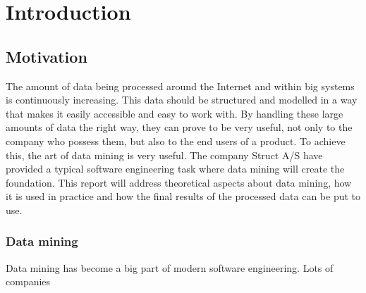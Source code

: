 
\chapter{Introduction} %

\label{ChapterX} %


\section{Motivation}
The amount of data being processed around the Internet and within big systems is continuously increasing. This data should be structured and modelled in a way that makes it easily accessible and easy to work with. By handling these large amounts of data the right way, they can prove to be very useful, not only to the company who possess them, but also to the end users of a product. To achieve this, the art of data mining is very useful.
The company Struct A/S have provided a typical software engineering task where data mining will create the foundation. This report will address theoretical aspects about data mining, how it is used in practice and how the final results of the processed data can be put to use.

\subsection{Data mining}
Data mining has become a big part of modern software engineering. Lots of companies 